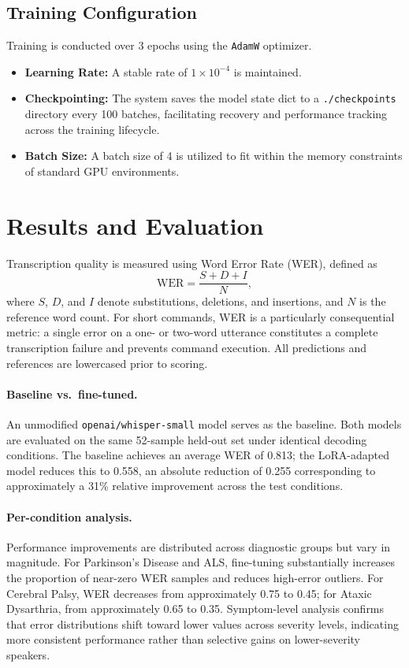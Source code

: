 \documentclass[11pt]{article}
\begin{document}
\subsection{Training Configuration}
Training is conducted over 3 epochs using the \texttt{AdamW} optimizer.

\begin{itemize}
    \item \textbf{Learning Rate:} A stable rate of $1 \times 10^{-4}$ is maintained.
    \item \textbf{Checkpointing:} The system saves the model state dict to a \texttt{./checkpoints} directory every 100 batches, facilitating recovery and performance tracking across the training lifecycle.
    \item \textbf{Batch Size:} A batch size of 4 is utilized to fit within the memory constraints of standard GPU environments.
\end{itemize}

\section{Results and Evaluation}

Transcription quality is measured using Word Error Rate (WER), defined as
\[
  \mathrm{WER} = \frac{S + D + I}{N},
\]
where $S$, $D$, and $I$ denote substitutions, deletions, and insertions, and $N$ is the reference word count. For short commands, WER is a particularly consequential metric: a single error on a one- or two-word utterance constitutes a complete transcription failure and prevents command execution. All predictions and references are lowercased prior to scoring.

\paragraph{Baseline vs.\ fine-tuned.}
An unmodified \texttt{openai/whisper-small} model serves as the baseline. Both models are evaluated on the same 52-sample held-out set under identical decoding conditions. The baseline achieves an average WER of 0.813; the LoRA-adapted model reduces this to 0.558, an absolute reduction of 0.255 corresponding to approximately a 31\% relative improvement across the test conditions.

\paragraph{Per-condition analysis.}
Performance improvements are distributed across diagnostic groups but vary in magnitude. For Parkinson's Disease and ALS, fine-tuning substantially increases the proportion of near-zero WER samples and reduces high-error outliers. For Cerebral Palsy, WER decreases from approximately 0.75 to 0.45; for Ataxic Dysarthria, from approximately 0.65 to 0.35. Symptom-level analysis confirms that error distributions shift toward lower values across severity levels, indicating more consistent performance rather than selective gains on lower-severity speakers.
\end{document}
